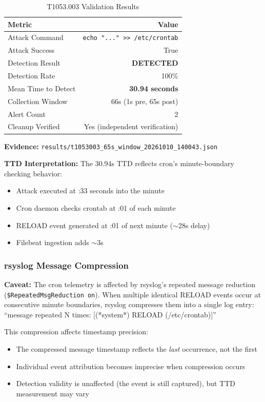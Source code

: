 \documentclass[11pt,a4paper]{article}
\begin{document}
\begin{table}[H]
    \centering
    \caption{T1053.003 Validation Results}
    \begin{tabular}{lr}
        \toprule
        \textbf{Metric} & \textbf{Value} \\
        \midrule
        Attack Command & \texttt{echo "..." >> /etc/crontab} \\
        Attack Success & True \\
        Detection Result & \textbf{DETECTED} \\
        Detection Rate & 100\% \\
        Mean Time to Detect & \textbf{30.94 seconds} \\
        Collection Window & 66s (1s pre, 65s post) \\
        Alert Count & 2 \\
        Cleanup Verified & Yes (independent verification) \\
        \bottomrule
    \end{tabular}
\end{table}

\textbf{Evidence:} \texttt{results/t1053003\_65s\_window\_20261010\_140043.json}

\textbf{TTD Interpretation:} The 30.94s TTD reflects cron's minute-boundary checking behavior:
\begin{itemize}
    \item Attack executed at :33 seconds into the minute
    \item Cron daemon checks crontab at :01 of each minute
    \item RELOAD event generated at :01 of next minute ($\sim$28s delay)
    \item Filebeat ingestion adds $\sim$3s
\end{itemize}

\subsubsection{rsyslog Message Compression}

\textbf{Caveat:} The cron telemetry is affected by rsyslog's repeated message reduction (\texttt{\$RepeatedMsgReduction on}). When multiple identical RELOAD events occur at consecutive minute boundaries, rsyslog compresses them into a single log entry: ``message repeated N times: [(*system*) RELOAD (/etc/crontab)]''

This compression affects timestamp precision:
\begin{itemize}
    \item The compressed message timestamp reflects the \emph{last} occurrence, not the first
    \item Individual event attribution becomes imprecise when compression occurs
    \item Detection validity is unaffected (the event is still captured), but TTD measurement may vary
\end{itemize}
\end{document}
